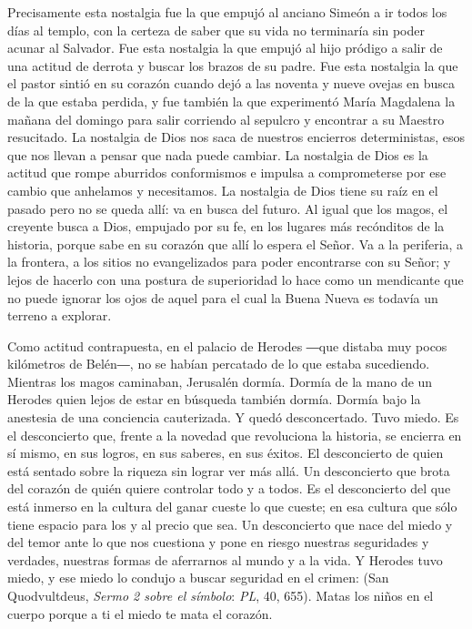 \begin{body}
					Precisamente esta nostalgia fue la que empujó al anciano Simeón a ir todos los días al templo, con la certeza de saber que su vida no terminaría sin poder acunar al Salvador. Fue esta nostalgia la que empujó al hijo pródigo a salir de una actitud de derrota y buscar los brazos de su padre. Fue esta nostalgia la que el pastor sintió en su corazón cuando dejó a las noventa y nueve ovejas en busca de la que estaba perdida, y fue también la que experimentó María Magdalena la mañana del domingo para salir corriendo al sepulcro y encontrar a su Maestro resucitado. La nostalgia de Dios nos saca de nuestros encierros deterministas, esos que nos llevan a pensar que nada puede cambiar. La nostalgia de Dios es la actitud que rompe aburridos conformismos e impulsa a comprometerse por ese cambio que anhelamos y necesitamos. La nostalgia de Dios tiene su raíz en el pasado pero no se queda allí: va en busca del futuro. Al igual que los magos, el creyente  busca a Dios, empujado por su fe, en los lugares más recónditos de la historia, porque sabe en su corazón que allí lo espera el Señor. Va a la periferia, a la frontera, a los sitios no evangelizados para poder encontrarse con su Señor; y lejos de hacerlo con una postura de superioridad lo hace como un mendicante que no puede ignorar los ojos de aquel para el cual la Buena Nueva es todavía un terreno a explorar.
					
					Como actitud contrapuesta, en el palacio de Herodes ―que distaba muy pocos kilómetros de Belén―, no se habían percatado de lo que estaba sucediendo. Mientras los magos caminaban, Jerusalén dormía. Dormía de la mano de un Herodes quien lejos de estar en búsqueda también dormía. Dormía bajo la anestesia de una conciencia cauterizada. Y quedó desconcertado. Tuvo miedo. Es el desconcierto que, frente a la novedad que revoluciona la historia, se encierra en sí mismo, en sus logros, en sus saberes, en sus éxitos. El desconcierto de quien está sentado sobre la riqueza sin lograr ver más allá. Un desconcierto que brota del corazón de quién quiere controlar todo y a todos. Es el desconcierto del que está inmerso en la cultura del ganar cueste lo que cueste; en esa cultura que sólo tiene espacio para los  y al precio que sea. Un desconcierto que nace del miedo y del temor ante lo que nos cuestiona y pone en riesgo nuestras seguridades y verdades, nuestras formas de aferrarnos al mundo y a la vida. Y Herodes tuvo miedo, y ese miedo lo condujo a buscar seguridad en el crimen:  (San Quodvultdeus, \emph{Sermo 2 sobre el símbolo}: \emph{PL}, 40, 655). Matas los niños en el cuerpo porque a ti el miedo te mata el corazón.
					

\end{body}
